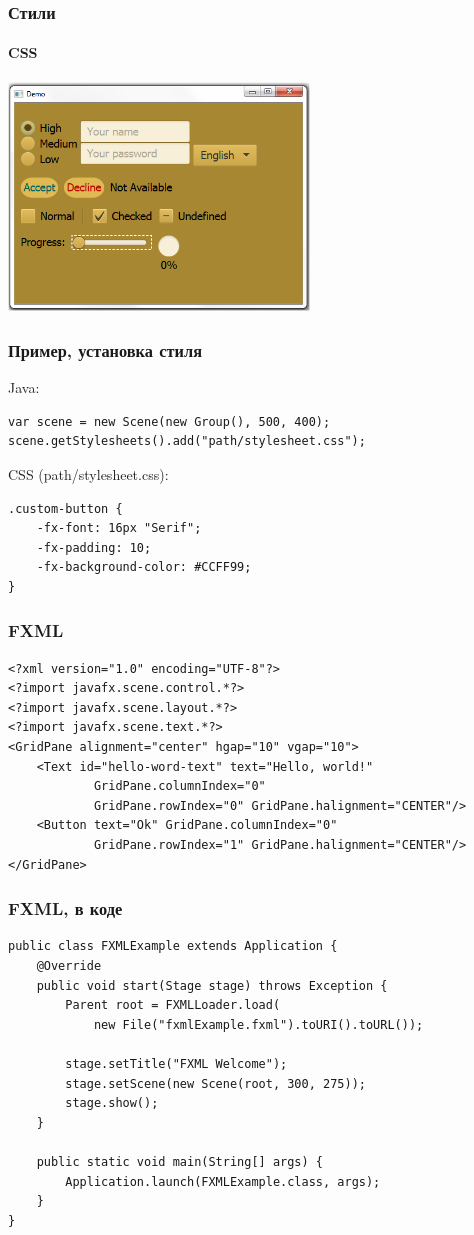 \documentclass[xetex,mathserif,serif]{beamer}
\begin{document}
	\begin{frame}
		\frametitle{Стили}
		\framesubtitle{CSS}
		\begin{center}
			\includegraphics[width=0.6\textwidth]{styles.png}
		\end{center}
	\end{frame}

	\begin{frame}[fragile]
		\frametitle{Пример, установка стиля}
		Java:
		\begin{verbatim}
var scene = new Scene(new Group(), 500, 400);
scene.getStylesheets().add("path/stylesheet.css");
		\end{verbatim}
		\vspace{1cm}
		CSS (path/stylesheet.css):
		\begin{verbatim}
.custom-button {
    -fx-font: 16px "Serif";
    -fx-padding: 10;
    -fx-background-color: #CCFF99;
}
		\end{verbatim}
\end{frame}

	\begin{frame}[fragile]
		\frametitle{FXML}
		\begin{verbatim}
<?xml version="1.0" encoding="UTF-8"?>
<?import javafx.scene.control.*?>
<?import javafx.scene.layout.*?>
<?import javafx.scene.text.*?>
<GridPane alignment="center" hgap="10" vgap="10">
    <Text id="hello-word-text" text="Hello, world!"
            GridPane.columnIndex="0"
            GridPane.rowIndex="0" GridPane.halignment="CENTER"/>
    <Button text="Ok" GridPane.columnIndex="0"
            GridPane.rowIndex="1" GridPane.halignment="CENTER"/>
</GridPane>
		\end{verbatim}
\end{frame}

	\begin{frame}[fragile]
		\frametitle{FXML, в коде}
		\begin{verbatim}
public class FXMLExample extends Application {
    @Override
    public void start(Stage stage) throws Exception {
        Parent root = FXMLLoader.load(
            new File("fxmlExample.fxml").toURI().toURL());

        stage.setTitle("FXML Welcome");
        stage.setScene(new Scene(root, 300, 275));
        stage.show();
    }

    public static void main(String[] args) {
        Application.launch(FXMLExample.class, args);
    }
}
		\end{verbatim}
	\end{frame}
\end{document}
